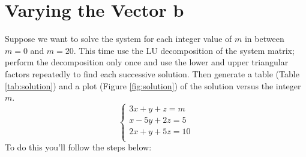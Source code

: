 \section{Varying the Vector $\mathbf{b}$}
Suppose we want to solve the system for each integer value of $m$ in between $m = 0$ and $m = 20$. This time use the LU decomposition of the system matrix; perform the decomposition only once and use the lower and upper triangular factors repeatedly to find each successive solution. Then generate a table (Table \ref{tab:solution}) and a plot (Figure \ref{fig:solution}) of the solution versus the integer $m$.
\begin{equation}
  \label{eq:sys}
  \begin{cases}
    3 x + y + z = m \\
    x - 5 y + 2 z = 5 \\
    2 x + y + 5 z = 10 \\
  \end{cases}
\end{equation}
To do this you'll follow the steps below:
